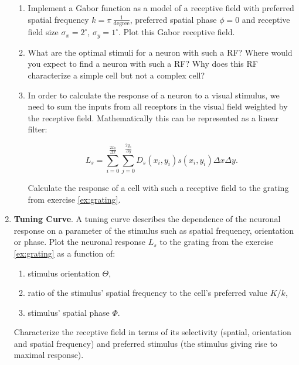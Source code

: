 \documentclass[12pt, a4]{article}
\begin{document}
\begin{enumerate}
        \begin{enumerate}
            \item \label{ex:Gabor}  Implement a Gabor function as a model of
                a receptive field with preferred spatial frequency
                $k=\pi\,\frac{1}{\mathrm{degree}}$,
                preferred spatial phase $\phi=0$
                and receptive field size $\sigma_x=2^\circ$,
                $\sigma_y=1^\circ$. Plot this Gabor receptive field.
                
            \item \label{ex:RF_questions} What are the optimal stimuli for
                a neuron with such a RF? Where would you expect
                to find a neuron with such a RF?  Why does this RF
                characterize a simple cell but not a complex
                cell?
            \item In order to calculate the response of a neuron to a
                visual stimulus, we need to sum the inputs from all
                receptors in the visual field weighted by the
                receptive field. Mathematically this can be
                represented as a linear filter:
                

                \begin{equation}
                    L_s = \sum_{i=0}^{\frac{2x_0}{\Delta x}}
                    \sum_{j=0}^{\frac{2y_0}{\Delta y}} D_s(x_i,y_i) s(x_i,y_i)
                    \Delta x \Delta y.
                    \label{eq:respons}
                \end{equation}
                
                Calculate the response of a cell with such a
                receptive field to the grating from exercise
                \ref{ex:grating}.
        \end{enumerate}

    \item\label{ex:tune_curve} \textbf{Tuning Curve}. A tuning curve describes the dependence of
        the neuronal response on a parameter of the stimulus such as
        spatial frequency, orientation or phase. Plot the neuronal
        response $L_s$ to the grating from the exercise \ref{ex:grating} as a 
        function of:

        \begin{enumerate}
            \item\label{ex:tuneorient} stimulus orientation $\Theta$,
            \item ratio of the stimulus' spatial frequency to the
                cell's preferred value $K/k$,
            \item\label{ex:tunephase} stimulus' spatial phase  $\Phi$.

        \end{enumerate}
        Characterize the receptive field in terms of its selectivity
        (spatial, orientation and spatial frequency) and preferred stimulus
        (the stimulus giving rise to maximal response). 

\end{enumerate}
\end{document}
